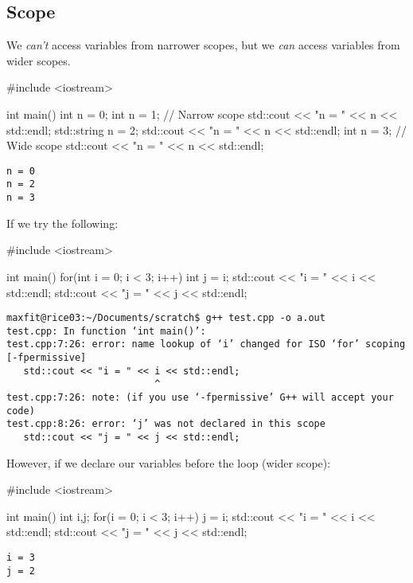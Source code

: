 \documentclass[12pt,letterpaper,twoside]{article}
\begin{document}
\subsection{Scope}

We \textit{can't} access variables from narrower scopes, but we \textit{can} access variables from wider scopes.
\begin{cpp}
#include <iostream>

int main() {
  int n = 0;
  { int n = 1; }                              // Narrow scope
  std::cout << "n = " << n << std::endl;
  std::string n = 2;
  std::cout << "n = " << n << std::endl;
  {
    int n = 3;                                // Wide scope             
    { std::cout << "n = " << n << std::endl; }
  }
}
\end{cpp}
\vspace{-3ex}
{\footnotesize
\begin{verbatim}
n = 0
n = 2
n = 3
\end{verbatim}
}

If we try the following:
\begin{cpp}
#include <iostream>                     
                                        
int main() {                            
  for(int i = 0; i < 3; i++){           
    int j = i;                          
  }                                     
  std::cout << "i = " << i << std::endl;
  std::cout << "j = " << j << std::endl;
}
\end{cpp}
\vspace{-3ex}
{\footnotesize
\begin{verbatim}
maxfit@rice03:~/Documents/scratch$ g++ test.cpp -o a.out
test.cpp: In function ‘int main()’:
test.cpp:7:26: error: name lookup of ‘i’ changed for ISO ‘for’ scoping [-fpermissive]
   std::cout << "i = " << i << std::endl;
                          ^
test.cpp:7:26: note: (if you use ‘-fpermissive’ G++ will accept your code)
test.cpp:8:26: error: ‘j’ was not declared in this scope
   std::cout << "j = " << j << std::endl;
\end{verbatim}
}

However, if we declare our variables before the loop (wider scope):
\begin{cpp}
#include <iostream>

int main() {
  int i,j;
  for(i = 0; i < 3; i++){
    j = i;
  }
  std::cout << "i = " << i << std::endl;
  std::cout << "j = " << j << std::endl;
}
\end{cpp}
\vspace{-3ex}
{\footnotesize
\begin{verbatim}
i = 3
j = 2
\end{verbatim}
}
\end{document}
